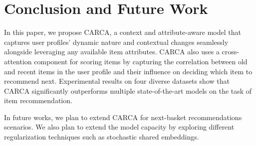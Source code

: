 \documentclass[sigconf,natbib=true]{acmart}
\begin{document}
\section{Conclusion and Future Work}

In this paper, we propose CARCA, a context and attribute-aware model that captures user profiles' dynamic nature and contextual changes seamlessly alongside leveraging any available item attributes. CARCA also uses a cross-attention component for scoring items by capturing the correlation between old and recent items in the user profile and their influence on deciding which item to recommend next. Experimental results on four diverse datasets show that CARCA significantly outperforms multiple state-of-the-art models on the task of item recommendation.


In future works, we plan to extend CARCA for next-basket recommendations scenarios. We also plan to extend the model capacity by exploring different regularization techniques such as stochastic shared embeddings.
\end{document}
